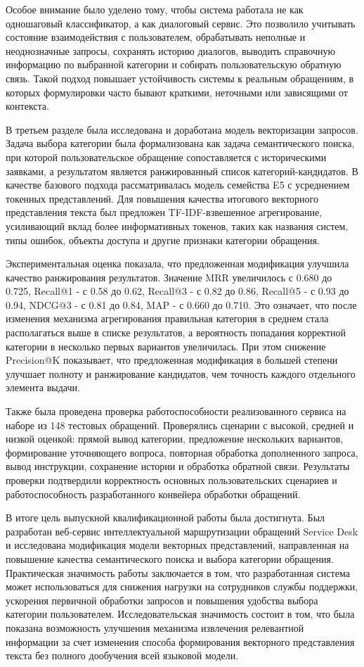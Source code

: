\documentclass[14pt,a4paper]{extarticle}
\numberwithin{figure}{section}
\numberwithin{table}{section}
\begin{document}
Особое внимание было уделено тому, чтобы система работала не как
одношаговый классификатор, а как диалоговый сервис. Это позволило
учитывать состояние взаимодействия с пользователем, обрабатывать
неполные и неоднозначные запросы, сохранять историю диалогов, выводить
справочную информацию по выбранной категории и собирать пользовательскую
обратную связь. Такой подход повышает устойчивость системы к реальным
обращениям, в которых формулировки часто бывают краткими, неточными или
зависящими от контекста.

В третьем разделе была исследована и доработана модель векторизации
запросов. Задача выбора категории была формализована как задача
семантического поиска, при которой пользовательское обращение
сопоставляется с историческими заявками, а результатом является
ранжированный список категорий-кандидатов. В качестве базового подхода
рассматривалась модель семейства E5 с усреднением токенных представлений. Для повышения
качества итогового векторного представления текста был предложен TF-IDF-взвешенное
агрегирование, усиливающий вклад более информативных токенов, таких как
названия систем, типы ошибок, объекты доступа и другие признаки
категории обращения.

Экспериментальная оценка показала, что предложенная модификация улучшила
качество ранжирования результатов. Значение MRR увеличилось с 0.680 до
0.725, Recall@1 - с 0.58 до 0.62, Recall@3 - с 0.82 до 0.86, Recall@5 -
с 0.93 до 0.94, NDCG@3 - с 0.81 до 0.84, MAP - с 0.660 до 0.710. Это
означает, что после изменения механизма агрегирования правильная категория в
среднем стала располагаться выше в списке результатов, а вероятность
попадания корректной категории в несколько первых вариантов увеличилась.
При этом снижение Precision@K показывает, что предложенная модификация в
большей степени улучшает полноту и ранжирование кандидатов, чем точность
каждого отдельного элемента выдачи.

Также была проведена проверка работоспособности реализованного сервиса
на наборе из 148 тестовых обращений. Проверялись сценарии с высокой,
средней и низкой оценкой: прямой вывод категории, предложение
нескольких вариантов, формирование уточняющего вопроса, повторная
обработка дополненного запроса, вывод инструкции, сохранение истории и
обработка обратной связи. Результаты проверки подтвердили корректность
основных пользовательских сценариев и работоспособность разработанного
конвейера обработки обращений.

В итоге цель выпускной квалификационной работы была достигнута. Был
разработан веб-сервис интеллектуальной маршрутизации обращений Service
Desk и исследована модификация модели векторных представлений, направленная на
повышение качества семантического поиска и выбора категории обращения.
Практическая значимость работы заключается в том, что разработанная
система может использоваться для снижения нагрузки на сотрудников службы
поддержки, ускорения первичной обработки запросов и повышения удобства
выбора категории пользователем. Исследовательская значимость состоит в
том, что была показана возможность улучшения механизма извлечения релевантной информации за счет
изменения способа формирования векторного представления текста без полного дообучения
всей языковой модели.
\end{document}

